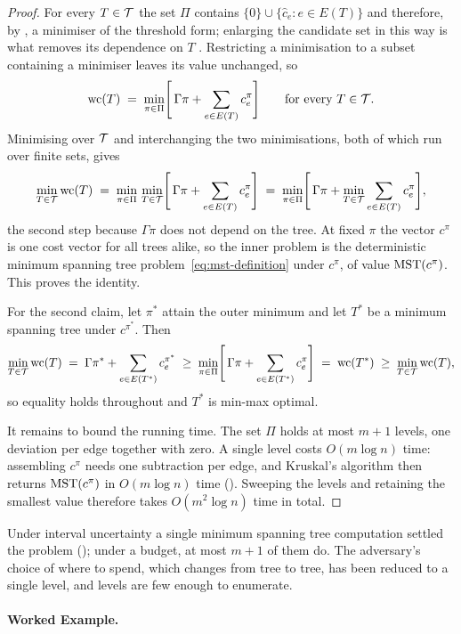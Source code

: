 \begin{proof}
For every $T \in \mathcal{T}$ the set $\Pi$ contains $\{0\} \cup \{\hat{c}_e : e \in E(T)\}$ and therefore, by , a minimiser of the threshold form; enlarging the candidate set in this way is what removes its dependence on $T$ \cite[Lemma~4.20]{Goerigk2021RCO}.
Restricting a minimisation to a subset containing a minimiser leaves its value unchanged, so
\[
\mathrm{wc}(T) \;=\; \min_{\pi \in \Pi} \Biggl[\, \Gamma\pi + \sum_{e \in E(T)} c^{\pi}_e \Biggr]
\qquad \text{for every } T \in \mathcal{T}.
\]
Minimising over $\mathcal{T}$ and interchanging the two minimisations, both of which run over finite sets, gives
\[
\min_{T \in \mathcal{T}} \mathrm{wc}(T)
\;=\; \min_{\pi \in \Pi} \, \min_{T \in \mathcal{T}} \Biggl[\, \Gamma\pi + \sum_{e \in E(T)} c^{\pi}_e \Biggr]
\;=\; \min_{\pi \in \Pi} \Biggl[\, \Gamma\pi + \min_{T \in \mathcal{T}} \sum_{e \in E(T)} c^{\pi}_e \Biggr],
\]
the second step because $\Gamma\pi$ does not depend on the tree.
At fixed $\pi$ the vector $c^{\pi}$ is one cost vector for all trees alike, so the inner problem is the deterministic minimum spanning tree problem~\eqref{eq:mst-definition} under $c^{\pi}$, of value $\mathrm{MST}(c^{\pi})$.
This proves the identity.

For the second claim, let $\pi^{*}$ attain the outer minimum and let $T^{*}$ be a minimum spanning tree under $c^{\pi^{*}}$.
Then
\[
\min_{T \in \mathcal{T}} \mathrm{wc}(T) \;=\; \Gamma\pi^{*} + \sum_{e \in E(T^{*})} c^{\pi^{*}}_e
\;\geq\; \min_{\pi \in \Pi} \Biggl[\, \Gamma\pi + \sum_{e \in E(T^{*})} c^{\pi}_e \Biggr]
\;=\; \mathrm{wc}(T^{*})
\;\geq\; \min_{T \in \mathcal{T}} \mathrm{wc}(T),
\]
so equality holds throughout and $T^{*}$ is min-max optimal.

It remains to bound the running time.
The set $\Pi$ holds at most $m+1$ levels, one deviation per edge together with zero.
A single level costs $O(m \log n)$ time: assembling $c^{\pi}$ needs one subtraction per edge, and Kruskal's algorithm then returns $\mathrm{MST}(c^{\pi})$ in $O(m \log n)$ time ().
Sweeping the levels and retaining the smallest value therefore takes $O(m^{2} \log n)$ time in total.
\end{proof}

Under interval uncertainty a single minimum spanning tree computation settled the problem (); under a budget, at most $m+1$ of them do.
The adversary's choice of where to spend, which changes from tree to tree, has been reduced to a single level, and levels are few enough to enumerate.


\paragraph{Worked Example.}

